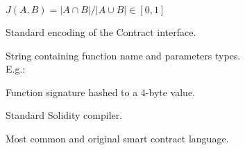 \documentclass[../main.tex]{subfiles}
\begin{document}
\begin{description}[style=unboxed,leftmargin=0pt]
  \item[Jaccard-Index] \(J(A,B) = |A \cap B| / |A \cup B| \in [0,1]\)
  \item[ABI] Standard encoding of the Contract interface.
  \item[Function signature] String containing function name and parameters types.\\E.g.: 
  \item[Fourbyte signature] Function signature hashed to a 4-byte value.
  \item[solc] Standard Solidity compiler.
  \item[Solidity] Most common and original smart contract language.
\end{description}
\end{document}
